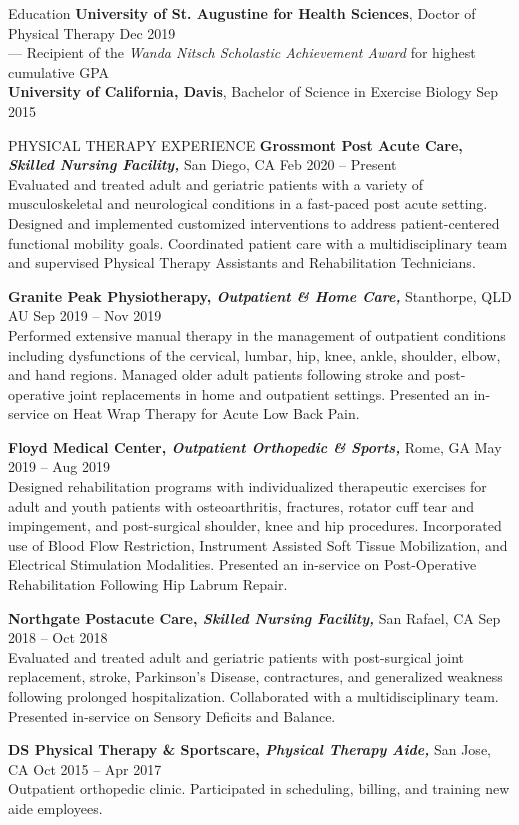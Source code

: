 \documentclass{resume} %
\begin{document}
\vspace{-15pt}
\begin{rSection}{Education}
\textbf{University of St. Augustine for Health Sciences}, Doctor of Physical Therapy \hfill {Dec 2019}
\\
\-\hspace{5mm} --- Recipient of the \textit{Wanda Nitsch Scholastic Achievement Award} for highest cumulative GPA
\\
\textbf{University of California, Davis}, Bachelor of Science in Exercise Biology \hfill {Sep 2015}
\end{rSection}
\begin{rSection}{PHYSICAL THERAPY EXPERIENCE}
\textbf{Grossmont Post Acute Care, \textit{Skilled Nursing Facility,}} San Diego, CA
\hfill Feb 2020 -- Present\\
Evaluated and treated adult and geriatric patients with a variety of musculoskeletal and neurological conditions in a fast-paced post acute setting. Designed and implemented customized interventions to address patient-centered functional mobility goals. Coordinated patient care with a multidisciplinary team and supervised Physical Therapy Assistants and Rehabilitation Technicians. 

\textbf{Granite Peak Physiotherapy, \textit{Outpatient \& Home Care,}} Stanthorpe, QLD AU
\hfill Sep 2019 -- Nov 2019\\
Performed extensive manual therapy in the management of outpatient conditions including dysfunctions of the cervical, lumbar, hip, knee, ankle, shoulder, elbow, and hand regions. Managed older adult patients following stroke and post-operative joint replacements in home and outpatient settings. Presented an in-service on Heat Wrap Therapy for Acute Low Back Pain.

\textbf{Floyd Medical Center, \textit{Outpatient Orthopedic \& Sports,}} Rome, GA
\hfill May 2019 -- Aug 2019 \\
Designed rehabilitation programs with individualized therapeutic exercises for adult and youth patients with osteoarthritis, fractures, rotator cuff tear and impingement, and post-surgical shoulder, knee and hip procedures. Incorporated use of Blood Flow Restriction, Instrument Assisted Soft Tissue Mobilization, and Electrical Stimulation Modalities. Presented an in-service on Post-Operative Rehabilitation Following Hip Labrum Repair.

\textbf{Northgate Postacute Care, \textit{Skilled Nursing Facility,}} San Rafael, CA
\hfill Sep 2018 -- Oct 2018\\
Evaluated and treated adult and geriatric patients with post-surgical joint replacement, stroke, Parkinson's Disease, contractures, and generalized weakness following prolonged hospitalization. Collaborated with a multidisciplinary team. Presented in-service on Sensory Deficits and Balance.

\textbf{DS Physical Therapy \& Sportscare, \textit{Physical Therapy Aide,}} San Jose, CA
\hfill Oct 2015 -- Apr 2017\\
Outpatient orthopedic clinic. Participated in scheduling, billing, and training new aide employees.
\end{rSection} 
\end{document}
